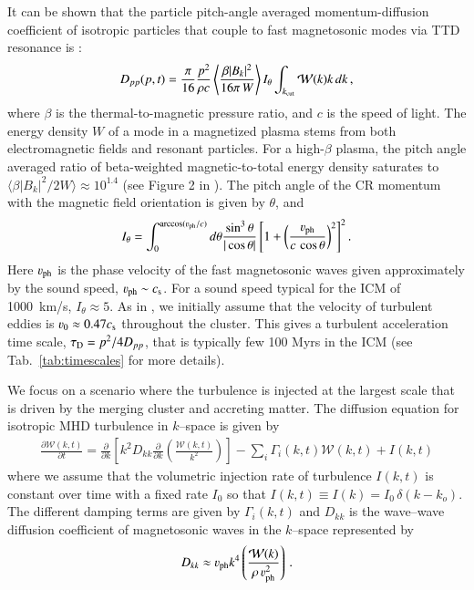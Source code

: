 \documentclass[fleqn,usenatbib,useAMS]{mnras}
\newcommand{\Vph}{\varv_\mathrm{ph}}
\begin{document}
It can be shown that the particle pitch-angle averaged
momentum-diffusion coefficient of isotropic particles that couple to
fast magnetosonic modes via TTD resonance is \citep[][
  Eqn. 47]{brunetti07}:
\begin{eqnarray}
  D_{pp}(p,t) = \frac{\pi}{16} \frac{p^2}{\rho c}
  \left\langle\frac{\beta |B_k|^2}{16 \pi \,W}\right\rangle
  I_\theta
  \int_{k_{\mathrm{cut}}}\mathcal{W}(k)k\,d k\,,
\label{eq:dpp}
\end{eqnarray}
where $\beta$ is the thermal-to-magnetic pressure ratio, and $c$
is the speed of light. The energy density $W$ of a mode in a
magnetized plasma stems from both electromagnetic fields and resonant
particles. For a high-$\beta$ plasma, the pitch angle averaged ratio of
beta-weighted magnetic-to-total energy density saturates to $\langle\beta
|B_k|^2/2W\rangle\approx 10^{1.4}$ (see Figure 2 in
\citealt{brunetti07}). The pitch angle of the CR momentum with the
magnetic field orientation is given by $\theta$, and
\begin{equation}
  \label{eq:I_theta}
  I_\theta=\int_0^{\arccos(\Vph/c)} d\theta {\frac{ \sin^3 \theta }{
    |\cos \theta | }}
\left[1+\left(\frac{\Vph}{c\,\cos{\theta}}\right)^2\right]^2.
\end{equation}
Here $\Vph$ is the phase velocity of the fast magnetosonic waves
given approximately by the sound speed, $\Vph \sim c_\rmn{s}$. For a
sound speed typical for the ICM of 1000~km/s, $I_\theta\approx5$. As
in \cite{brunetti07}, we initially assume that the velocity of
turbulent eddies is $\varv_0\approx 0.47 c_\rmn{s}$ throughout the
cluster. This gives a turbulent acceleration time scale, $\tau_{\rm D} =
p^2/4D_{pp}$, that is typically few 100 Myrs in the ICM (see
Tab.~\ref{tab:timescales} for more details).

We focus on a scenario where the turbulence is injected at the largest
scale that is driven by the merging cluster and accreting matter. The
diffusion equation for isotropic MHD turbulence in $k$--space is given
by
\begin{equation}
  \begin{aligned}
\frac{\partial {\mathcal W}(k,t)}{\partial t}
=
\frac{\partial}{\partial k}
\left[
k^2 D_{kk}
\frac{\partial}{\partial k}
\left( \frac{{\mathcal W}(k,t)}{k^2} \right)
\right]
- \sum_i \Gamma_i (k,t) {\mathcal W}(k,t)
+ I(k,t)
\end{aligned}
\label{modes_kinetic}
\end{equation}
where we assume that the volumetric injection rate of turbulence
$I(k,t)$ is constant over time with a fixed rate $I_0$ so that $I(k,t)
\equiv I(k) = I_0\,\delta (k - k_o)$. The different damping terms are
given by $\Gamma_i(k,t)$ and $D_{kk}$ is the wave--wave diffusion
coefficient of magnetosonic waves in the $k$--space represented by
\begin{equation}
  \label{eq:Dkk}
  D_{kk} \approx \Vph k^4
  \left(\frac{\mathcal{W}(k)}{\rho\,\Vph^2}\right)\,.
\end{equation}
\end{document}
